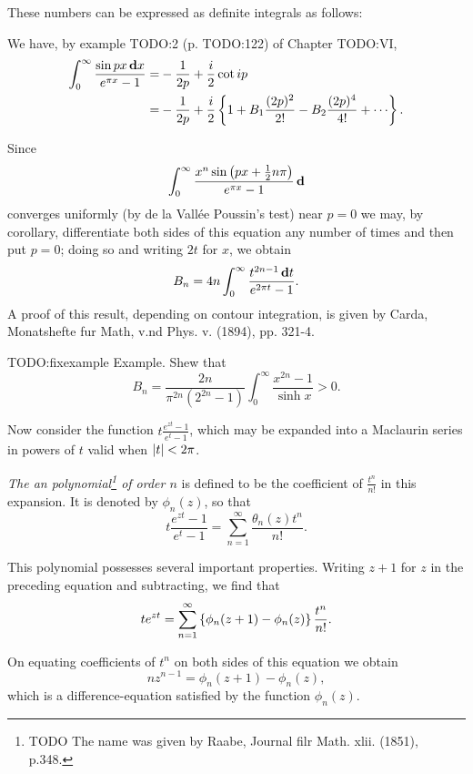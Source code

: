 %
%
These numbers can be expressed as definite integrals as follows:

We have, by example TODO:2 (p. TODO:122) of Chapter TODO:VI,
\begin{align*}
  \int_{0}^{\infty}
  \frac{\sin px \dmeasure x}{e^{\pi x} - 1}
  =&
  -\frac{1}{2p} + \frac{i}{2} \cot ip
  \\
  =&
  -\frac{1}{2p}
  +
  \frac{i}{2} \thebrace{
    1
    + B_{1} \frac{(2p)^{2}}{2!}
    - B_{2} \frac{(2p)^{4}}{4!}
    + \cdots
    }.
\end{align*}

Since
$$
\int_{0}^{\infty}
\frac{x^{n} \sin \left( px + \frac{1}{2} n \pi \right)}{e^{\pi x} - 1}
\, \mathbf{d}
$$
converges uniformly (by de la Vall\'ee Poussin's test) near
$p=0$ we
may, by  corollary, differentiate both
sides of this equation any number of times and then put $p = 0$; doing
so and writing $2t$ for $x$, we obtain
$$
B_{n}
=
4n
\int_{0}^{\infty}
\frac{t^{2n-1} \, \mathbf{d} t}{e^{2\pi t} - 1}.
$$
A proof of this result, depending on contour integration, is given by
Carda, Monatshefte fur Math, v.nd Phys. v. (1894), pp. 321-4.

TODO:fixexample
Example. Shew that
$$
B_{n}
=
\frac{2n}{\pi^{2n} (2^{2n}-1)}
\int_{0}^{\infty}
\frac{x^{2n}-1}{\sinh x}
> 0.
$$

Now consider the function $t \frac{e^{zt}-1}{e^{t}-1}$, which may be
expanded into a
Maclaurin series in powers of $t$ valid when $\left| t \right| < 2\pi$.

\emph{The \Bernoulli an polynomial\footnote{TODO The name was given by
    Raabe, Journal filr Math. xlii. (1851), p.348.} of order $n$} is
defined to be the coefficient of $\frac{t^{n}}{n!}$
in this expansion. It is denoted by $\phi_{n}(z)$, so that
$$
t \frac{e^{zt}-1}{e^{t}-1}
=
\sum_{n=1}^{\infty}
\frac{\theta_{n}(z) t^{n}}{n!}.
$$

This polynomial possesses several important properties. Writing $z+1$
for $z$ in the preceding equation and subtracting, we find that
$$
t e^{zt}
=
\sum_{n=1}^{\infty}
\left\{ 
  \phi_{n}(z+1) - \phi_{n}(z)
 \right\}
\frac{t^{n}}{n!}.
$$

On equating coefficients of $t^{n}$ on both
sides of this equation we obtain
$$
n z^{n-1}
=
\phi_{n}(z+1) - \phi_{n}(z),
$$
which is a difference-equation satisfied by the function $\phi_{n}(z)$.

%
%

